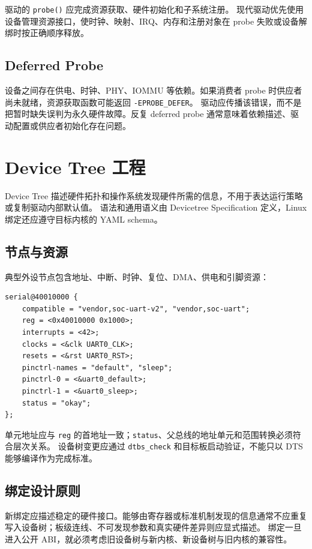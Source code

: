 驱动的 \texttt{probe()} 应完成资源获取、硬件初始化和子系统注册。
现代驱动优先使用设备管理资源接口，使时钟、映射、IRQ、内存和注册对象在 probe 失败或设备解绑时按正确顺序释放。

\subsection{Deferred Probe}

设备之间存在供电、时钟、PHY、IOMMU 等依赖。如果消费者 probe 时供应者尚未就绪，资源获取函数可能返回 \texttt{-EPROBE\_DEFER}。
驱动应传播该错误，而不是把暂时缺失误判为永久硬件故障。反复 deferred probe 通常意味着依赖描述、驱动配置或供应者初始化存在问题。

\section{Device Tree 工程}

Device Tree 描述硬件拓扑和操作系统发现硬件所需的信息，不用于表达运行策略或复制驱动内部默认值。
语法和通用语义由 Devicetree Specification 定义\cite{devicetree-spec}，Linux 绑定还应遵守目标内核的 YAML schema。

\subsection{节点与资源}

典型外设节点包含地址、中断、时钟、复位、DMA、供电和引脚资源：

\begin{lstlisting}[language=dts]
serial@40010000 {
    compatible = "vendor,soc-uart-v2", "vendor,soc-uart";
    reg = <0x40010000 0x1000>;
    interrupts = <42>;
    clocks = <&clk UART0_CLK>;
    resets = <&rst UART0_RST>;
    pinctrl-names = "default", "sleep";
    pinctrl-0 = <&uart0_default>;
    pinctrl-1 = <&uart0_sleep>;
    status = "okay";
};
\end{lstlisting}

单元地址应与 \texttt{reg} 的首地址一致；\texttt{status}、父总线的地址单元和范围转换必须符合层次关系。
设备树变更应通过 \texttt{dtbs\_check} 和目标板启动验证，不能只以 DTS 能够编译作为完成标准。

\subsection{绑定设计原则}

新绑定应描述稳定的硬件接口。能够由寄存器或标准机制发现的信息通常不应重复写入设备树；板级连线、不可发现参数和真实硬件差异则应显式描述。
绑定一旦进入公开 ABI，就必须考虑旧设备树与新内核、新设备树与旧内核的兼容性。

